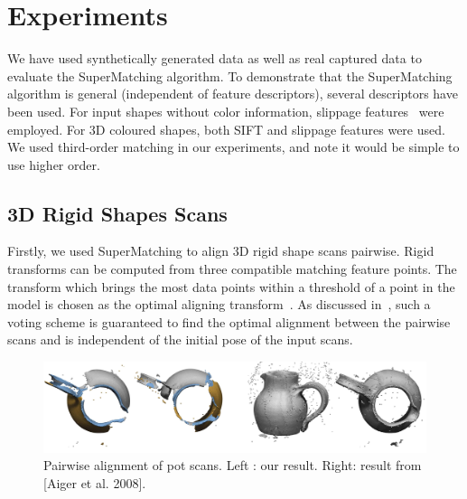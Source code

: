 \section{Experiments}
\label{sec:experiments}

We have used synthetically generated data as well as real captured data to evaluate the SuperMatching algorithm.
To demonstrate that the SuperMatching algorithm is general (independent of feature descriptors), several descriptors have been used.
For  input shapes without color information, slippage features~\cite{Bokeloh08} were employed.
For 3D coloured shapes, both SIFT and slippage features were used.
We used third-order matching in our experiments, and note it would be simple to use higher order.

\subsection{3D Rigid Shapes Scans}
\label{subsec:3DRigid}

Firstly, we used SuperMatching to align 3D rigid shape scans pairwise.
Rigid transforms can be computed from three compatible matching feature points.
The transform which brings the most data points within a threshold of a point in the model is chosen as the optimal aligning transform~\cite{Huttenlocher90}.
As discussed in~\cite{Gelfand05}, such a voting scheme is guaranteed to find the optimal alignment between the pairwise scans and is independent of the initial pose of the input scans.

\begin{figure}[t!]
\centering
  \includegraphics[width=0.99\linewidth]{figures/rigidCMP.jpg}
  \caption{Pairwise alignment of pot scans. Left : our result. Right: result from [Aiger et al. 2008].}
\label{fig:3DPair}
\end{figure}

